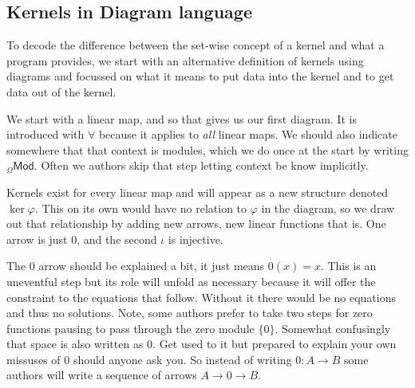 \documentclass[12pt,twoside,dvipsnames,letterpaper]{memoir}
\begin{document}
\subsection{Kernels in Diagram language}
To decode the difference between the set-wise concept of a kernel 
and what a program provides, we start with an alternative definition of kernels 
using diagrams and focussed on what it means to put data into the kernel
and to get data out of the kernel.

We start with a linear map, and so that gives us our first diagram.
It is introduced with $\forall$ because it applies to \emph{all} linear maps.
We should also indicate somewhere that that context is modules, which 
we do once at the start by writing ${_{\Omega} \mathsf{Mod}}$.  Often 
we authors skip that step letting context be know implicitly.
\begin{center}
\end{center}

Kernels exist for every linear map and will appear as a new structure denoted 
$\ker\varphi$.  This on its own would have no relation to $\varphi$ in the diagram, so we draw out that relationship by adding new arrows, new 
linear functions that is.  One arrow is 
just $0$, and the second $\iota$ is injective.  

The $0$ arrow should be explained a bit, it just means $0(x)=x$.  
This is an uneventful step but its role will unfold as necessary because it 
will offer the constraint to the equations that follow.  Without it there would 
be no equations and thus no solutions.  Note, some authors prefer to take 
two steps for zero functions pausing to pass through the zero module 
$\{0\}$.  Somewhat confusingly that space is also written as $0$. Get used to it but prepared to explain your own missuses of 0 should anyone ask you.
So instead of writing $0:A\to B$ some authors will write a sequence of arrows 
$A\to 0\to B$.
\end{document}
